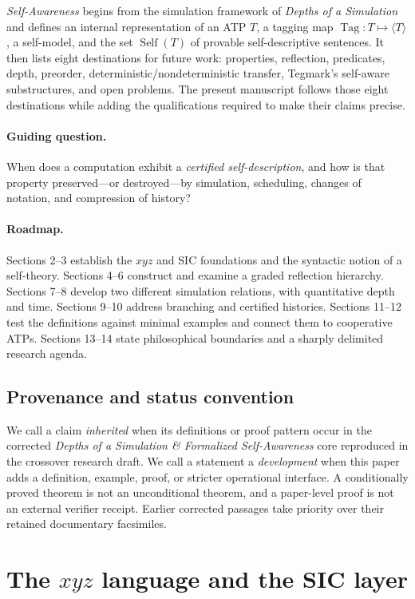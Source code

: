 \documentclass[11pt,letterpaper]{article}
\theoremstyle{definition}\newtheorem{definition}[theorem]{Definition}\newtheorem{example}[theorem]{Example}\newtheorem{protocol}[theorem]{Protocol}\newtheorem{question}[theorem]{Open Problem}
\theoremstyle{remark}\newtheorem{remark}[theorem]{Remark}
\newcommand{\Self}{\operatorname{Self}}
\newcommand{\Tag}{\operatorname{Tag}}
\begin{document}
\emph{Self-Awareness} begins from the simulation framework of \emph{Depths of a Simulation} and defines an internal representation of an ATP $T$, a tagging map $\Tag:T\mapsto\langle T\rangle$, a self-model, and the set $\Self(T)$ of provable self-descriptive sentences. It then lists eight destinations for future work: properties, reflection, predicates, depth, preorder, deterministic/nondeterministic transfer, Tegmark's self-aware substructures, and open problems. The present manuscript follows those eight destinations while adding the qualifications required to make their claims precise.

\paragraph{Guiding question.} When does a computation exhibit a \emph{certified self-description}, and how is that property preserved---or destroyed---by simulation, scheduling, changes of notation, and compression of history?

\paragraph{Roadmap.} Sections 2--3 establish the $xyz$ and SIC foundations and the syntactic notion of a self-theory. Sections 4--6 construct and examine a graded reflection hierarchy. Sections 7--8 develop two different simulation relations, with quantitative depth and time. Sections 9--10 address branching and certified histories. Sections 11--12 test the definitions against minimal examples and connect them to cooperative ATPs. Sections 13--14 state philosophical boundaries and a sharply delimited research agenda.

\subsection{Provenance and status convention}
We call a claim \emph{inherited} when its definitions or proof pattern occur in the corrected \emph{Depths of a Simulation \& Formalized Self-Awareness} core reproduced in the crossover research draft. We call a statement a \emph{development} when this paper adds a definition, example, proof, or stricter operational interface. A conditionally proved theorem is not an unconditional theorem, and a paper-level proof is not an external verifier receipt. Earlier corrected passages take priority over their retained documentary facsimiles.

\section{The $xyz$ language and the SIC layer}
\end{document}
